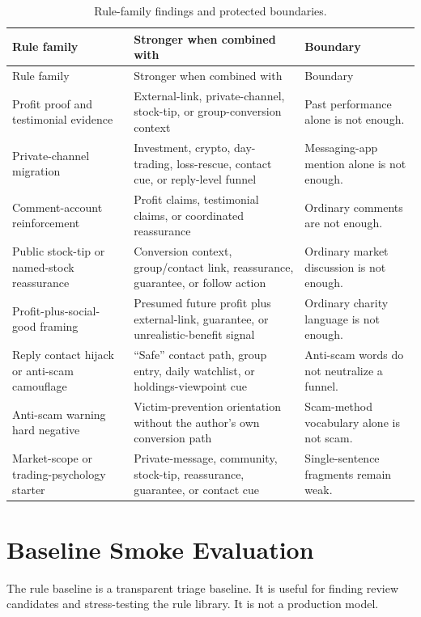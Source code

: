 \documentclass[11pt]{article}
\begin{document}
\begin{longtable}{@{}L{0.27\textwidth}L{0.37\textwidth}L{0.26\textwidth}@{}}
\caption{Rule-family findings and protected boundaries.}
\label{tab:rules}\\
\toprule
Rule family & Stronger when combined with & Boundary \\
\midrule
\endfirsthead
\toprule
Rule family & Stronger when combined with & Boundary \\
\midrule
\endhead
Profit proof and testimonial evidence &
External-link, private-channel, stock-tip, or group-conversion context &
Past performance alone is not enough. \\
Private-channel migration &
Investment, crypto, day-trading, loss-rescue, contact cue, or reply-level funnel &
Messaging-app mention alone is not enough. \\
Comment-account reinforcement &
Profit claims, testimonial claims, or coordinated reassurance &
Ordinary comments are not enough. \\
Public stock-tip or named-stock reassurance &
Conversion context, group/contact link, reassurance, guarantee, or follow action &
Ordinary market discussion is not enough. \\
Profit-plus-social-good framing &
Presumed future profit plus external-link, guarantee, or unrealistic-benefit signal &
Ordinary charity language is not enough. \\
Reply contact hijack or anti-scam camouflage &
``Safe'' contact path, group entry, daily watchlist, or holdings-viewpoint cue &
Anti-scam words do not neutralize a funnel. \\
Anti-scam warning hard negative &
Victim-prevention orientation without the author's own conversion path &
Scam-method vocabulary alone is not scam. \\
Market-scope or trading-psychology starter &
Private-message, community, stock-tip, reassurance, guarantee, or contact cue &
Single-sentence fragments remain weak. \\
\bottomrule
\end{longtable}

\section{Baseline Smoke Evaluation}

The rule baseline is a transparent triage baseline.
It is useful for finding review candidates and stress-testing the rule library.
It is not a production model.
\end{document}
